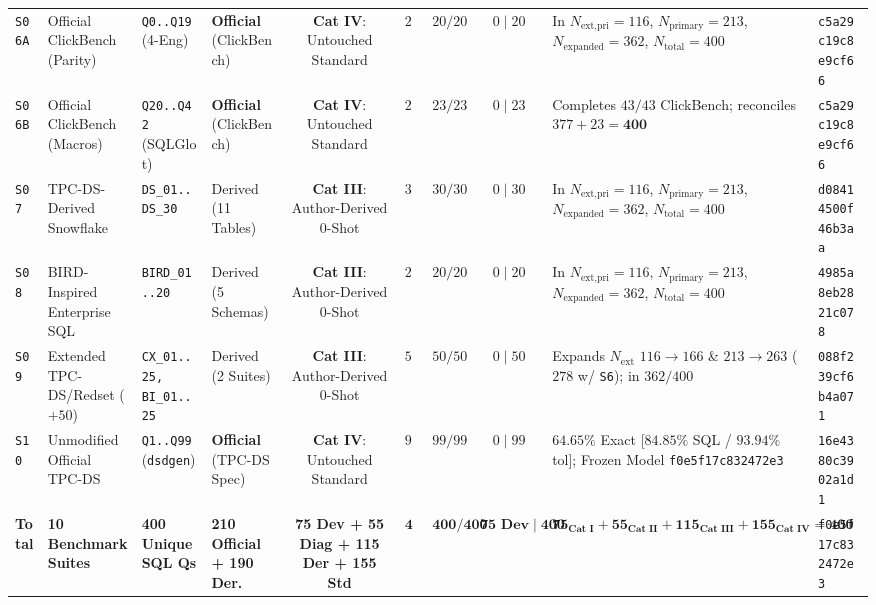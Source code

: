 \documentclass[10pt,a4paper]{article}
\newenvironment{fitasttable}{%
  \begin{lrbox}{\asttblbox}%
}{%
  \end{lrbox}%
  \sbox{\asttblboxB}{%
    \ifdim\wd\asttblbox>0.96\textwidth
      \resizebox{0.96\textwidth}{!}{\usebox{\asttblbox}}%
    \else
      \usebox{\asttblbox}%
    \fi
  }%
  \ifdim\ht\asttblboxB>0.78\textheight
    \resizebox{!}{0.78\textheight}{\usebox{\asttblboxB}}%
  \else
    \usebox{\asttblboxB}%
  \fi
}
\begin{document}
\begin{table}[!htbp]
\begin{fitasttable}
\begin{tabular}{@{}llllccccll@{}}
\texttt{S06A} & Official ClickBench (Parity) & \texttt{Q0..Q19} (4-Eng) & \textbf{Official} (ClickBench) & \textbf{Cat IV}: Untouched Standard & $20$ & $20/20$ & $0 \mid 20$ & In $N_{\text{ext,pri}}=116$, $N_{\text{primary}}=213$, $N_{\text{expanded}}=362$, $N_{\text{total}}=400$ & \texttt{c5a29c19c8e9cf66} \\
\texttt{S06B} & Official ClickBench (Macros) & \texttt{Q20..Q42} (SQLGlot) & \textbf{Official} (ClickBench) & \textbf{Cat IV}: Untouched Standard & $23$ & $23/23$ & $0 \mid 23$ & Completes $43/43$ ClickBench; reconciles $377 + 23 = \mathbf{400}$ & \texttt{c5a29c19c8e9cf66} \\
\texttt{S07} & TPC-DS-Derived Snowflake & \texttt{DS\_01..DS\_30} & Derived (11 Tables) & \textbf{Cat III}: Author-Derived 0-Shot & $30$ & $30/30$ & $0 \mid 30$ & In $N_{\text{ext,pri}}=116$, $N_{\text{primary}}=213$, $N_{\text{expanded}}=362$, $N_{\text{total}}=400$ & \texttt{d08414500f46b3aa} \\
\texttt{S08} & BIRD-Inspired Enterprise SQL & \texttt{BIRD\_01..20} & Derived (5 Schemas) & \textbf{Cat III}: Author-Derived 0-Shot & $20$ & $20/20$ & $0 \mid 20$ & In $N_{\text{ext,pri}}=116$, $N_{\text{primary}}=213$, $N_{\text{expanded}}=362$, $N_{\text{total}}=400$ & \texttt{4985a8eb2821c078} \\
\texttt{S09} & Extended TPC-DS/Redset ($+50$) & \texttt{CX\_01..25, BI\_01..25} & Derived (2 Suites) & \textbf{Cat III}: Author-Derived 0-Shot & $50$ & $50/50$ & $0 \mid 50$ & Expands $N_{\text{ext}}$ $116\rightarrow 166$ \& $213\rightarrow 263$ ($278$ w/ \texttt{S6}); in $362/400$ & \texttt{088f239cf6b4a071} \\
\texttt{S10} & Unmodified Official TPC-DS & \texttt{Q1..Q99} (\texttt{dsdgen}) & \textbf{Official} (TPC-DS Spec) & \textbf{Cat IV}: Untouched Standard & $99$ & $99/99$ & $0 \mid 99$ & $64.65\%$ Exact [$84.85\%$ SQL / $93.94\%$ tol]; Frozen Model \texttt{f0e5f17c832472e3} & \texttt{16e4380c3902a1d1} \\
\midrule
\textbf{Total} & \textbf{10 Benchmark Suites} & \textbf{400 Unique SQL Qs} & \textbf{210 Official + 190 Der.} & \textbf{75 Dev + 55 Diag + 115 Der + 155 Std} & $\mathbf{400}$ & $\mathbf{400/400}$ & $\mathbf{75\text{ Dev} \mid 400}$ & $\mathbf{75_{\text{Cat I}} + 55_{\text{Cat II}} + 115_{\text{Cat III}} + 155_{\text{Cat IV}} = 400}$ & \texttt{f0e5f17c832472e3} \\
\bottomrule
\end{tabular}
\end{fitasttable}
\end{table}
\end{document}
